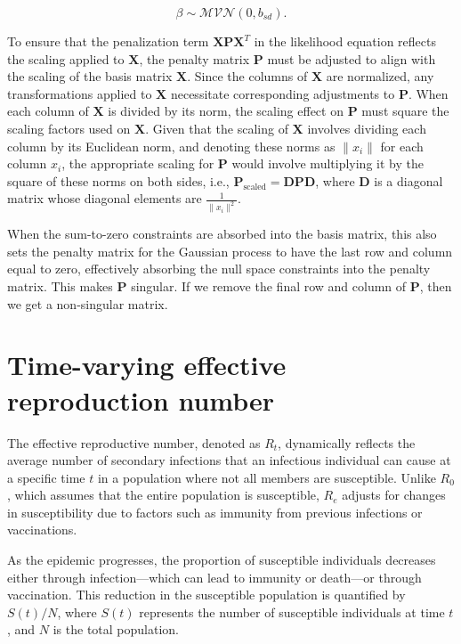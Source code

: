 \documentclass[
11pt, %
oneside, %
english, %
singlespacing, %
]{macthesis} %
\begin{document}
\[
\beta \sim \mathcal{MVN}(0, b_{sd}).
\]

To ensure that the penalization term \(\mathbf{X}\mathbf{P}\mathbf{X}^T\) in the likelihood equation reflects the scaling applied to \(\mathbf{X}\), the penalty matrix \(\mathbf{P}\) must be adjusted to align with the scaling of the basis matrix \(\mathbf{X}\). Since the columns of \(\mathbf{X}\) are normalized, any transformations applied to \(\mathbf{X}\) necessitate corresponding adjustments to \(\mathbf{P}\). When each column of \(\mathbf{X}\) is divided by its norm, the scaling effect on \(\mathbf{P}\) must square the scaling factors used on \(\mathbf{X}\). Given that the scaling of \(\mathbf{X}\) involves dividing each column by its Euclidean norm, and denoting these norms as \(\|x_i\|\) for each column \(x_i\), the appropriate scaling for \(\mathbf{P}\) would involve multiplying it by the square of these norms on both sides, i.e., \(\mathbf{P}_{\text{scaled}} = \mathbf{D}\mathbf{P}\mathbf{D}\), where \(\mathbf{D}\) is a diagonal matrix whose diagonal elements are \(\frac{1}{\|x_i\|^2}\).

When the sum-to-zero constraints are absorbed into the basis matrix, this also sets the penalty matrix for the Gaussian process to have the last row and column equal to zero, effectively absorbing the null space constraints into the penalty matrix. This makes \(\mathbf{P}\) singular. If we remove the final row and column of \(\mathbf{P}\), then we get a non-singular matrix.

\section{Time-varying effective reproduction number}\label{Time-varying-effective-reproduction-number}

The effective reproductive number, denoted as \(R_t\), dynamically reflects the average number of secondary infections that an infectious individual can cause at a specific time \(t\) in a population where not all members are susceptible. Unlike \(R_0\), which assumes that the entire population is susceptible, \(R_e\) adjusts for changes in susceptibility due to factors such as immunity from previous infections or vaccinations.

As the epidemic progresses, the proportion of susceptible individuals decreases either through infection---which can lead to immunity or death---or through vaccination. This reduction in the susceptible population is quantified by \(S(t)/N\), where \(S(t)\) represents the number of susceptible individuals at time \(t\), and \(N\) is the total population.
\end{document}
